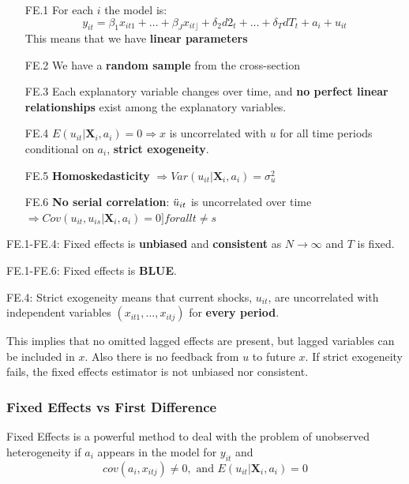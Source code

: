 \documentclass[11pt]{article}
\begin{document}
\begin{itemize}
    \item [FE.1] For each $i$ the model is:
    \begin{equation}
y_{i t}=\beta_1 x_{i t 1}+\ldots+\beta_J x_{i t\rfloor}+\delta_2 d 2_t+\ldots+\delta_T d T_t+a_i+u_{i t}
\end{equation}
This means that we have \textbf{linear parameters}
\item [FE.2] We have a \textbf{random sample} from the cross-section
\item [FE.3] Each explanatory variable changes over time, and \textbf{no perfect linear relationships} exist among the explanatory variables.
\item [FE.4] $E(u_{it}|\boldsymbol{X}_i, a_i) = 0 \Rightarrow x$ is uncorrelated with $u$ for all time periods conditional on $a_i$, \textbf{strict exogeneity}. 
\item[FE.5] \textbf{Homoskedasticity} $\Rightarrow Var(u_{it}|\boldsymbol{X}_i,a_i) = \sigma_u^2$
\item [FE.6] \textbf{No serial correlation}: $\Ddot{u}_{it}$ is uncorrelated over time $\Rightarrow Cov(u_{it},u_{is}|\boldsymbol{X}_i, a_i) = 0 ]forall
t\neq s$
\end{itemize}


\begin{note}
    FE.1-FE.4: Fixed effects is \textbf{unbiased} and \textbf{consistent} as $N \rightarrow \infty$ and $T$ is fixed.

    FE.1-FE.6: Fixed effects is \textbf{BLUE}.
\end{note}

FE.4: Strict exogeneity means that current shocks, $u_{it}$, are uncorrelated with independent variables $(x_{it1},\ldots, x_{itj})$ for \textbf{every period}.

This implies that no omitted lagged effects are present, but lagged variables can be included in $x$. Also there is no feedback from $u$ to future $x$. If strict exogeneity fails, the fixed effects estimator is not unbiased nor consistent.

\subsubsection{Fixed Effects vs First Difference}

Fixed Effects is a powerful method to deal with the problem of unobserved heterogeneity if $a_i$ appears in the model for $y_{it}$ and
\[cov(a_{i},x_{itj}) \neq 0, \text{ and } E(u_{it}|\boldsymbol{X}_i,a_i)=0\]
\end{document}
